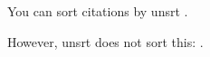 \documentclass[preview]{standalone}
\newcommand{\tA}[1]{\textcolor{cA}{#1}}
\newcommand{\tD}[1]{\textcolor{cD}{#1}}
\begin{document}
You can sort citations by unsrt \tA{\cite{refB,refA}}.

However, unsrt does not sort this: \tD{\cite{refA,refB}}.



\end{document}
